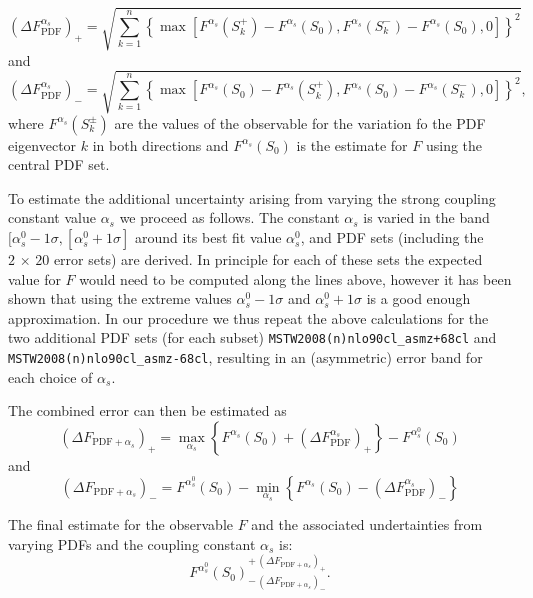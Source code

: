 \begin{equation}
\left(\Delta
F^{\alpha_s}_{\mathrm{PDF}}\right)_+ = \sqrt{\sum_{k=1}^{n}\left\{\max\left[
F^{\alpha_s}(S_k^+)-F^{\alpha_s}(S_0), F^{\alpha_s}(S_k^-)-F^{\alpha_s}(S_0),0\right]\right\}^2}
\end{equation}
and
\begin{equation}
\left(\Delta
F^{\alpha_s}_{\mathrm{PDF}}\right)_- = \sqrt{\sum_{k=1}^{n}\left\{\max\left[
F^{\alpha_s}(S_0)-F^{\alpha_s}(S_k^+),F^{\alpha_s}(S_0)-F^{\alpha_s}(S_k^-),0\right]\right\}^2},
\end{equation}
where $F^{\alpha_s}(S_k^\pm)$ are the values of the observable for the variation fo the PDF 
eigenvector $k$ in both directions and $F^{\alpha_s}(S_0)$ is the estimate for $F$ using the 
central PDF set.

To estimate the additional uncertainty arising from varying the strong coupling constant value 
$\alpha_s$ we proceed as follows. The constant $\alpha_s$ is varied in the band $[\alpha_s^0-1\sigma,[\alpha_s^0+1\sigma]$ 
around its best fit value $\alpha_s^0$, and PDF sets (including the $2\,\times\, 20$ error sets) 
are derived. In principle for each of these sets the expected value for $F$ would need to be 
computed along the lines above, however it has been shown
that using the extreme 
values $\alpha_s^0-1\sigma$ and $\alpha_s^0+1\sigma$ is a good enough approximation. In our 
procedure we thus repeat the above calculations for the two additional PDF sets (for each subset) 
{\tt MSTW2008(n)nlo90cl\_asmz+68cl} and {\tt MSTW2008(n)nlo90cl\_asmz-68cl}, resulting in an 
(asymmetric) error band for each choice of $\alpha_s$.

The combined error can then be estimated as
\begin{equation}
\left(\Delta F_{\mathrm{PDF}+\alpha_s}\right)_+=
\max_{\alpha_s}  \left\{F^{\alpha_s}(S_0)+  
\left(\Delta F^{\alpha_s}_{\mathrm{PDF}}\right)_+ \right\} -F^{\alpha_s^0}(S_0)
\end{equation}
and
\begin{equation}
\left(\Delta F_{\mathrm{PDF}+\alpha_s}\right)_-=
F^{\alpha_s^0}(S_0)-
\min_{\alpha_s}\left\{F^{\alpha_s}(S_0)-\left(\Delta
F^{\alpha_s}_{\mathrm{PDF}}\right)_-\right\}
\end{equation}

The final estimate for the observable $F$ and the associated undertainties from varying PDFs and the 
coupling constant $\alpha_s$ is:
\begin{equation}
F^{\alpha_s^0}(S_0)^{+\,\left(\Delta F_{\mathrm{PDF}+\alpha_s}\right)_+}_{-\,\left(\Delta F_{\mathrm{PDF}+\alpha_s}\right)_-}.
\end{equation}

